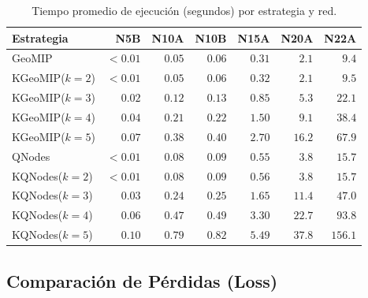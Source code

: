 \begin{table}[H]
    \centering
    \caption{Tiempo promedio de ejecución (segundos) por estrategia y red.}
    \label{tab:tiempos}
    \begin{tabular}{lrrrrrr}
        \toprule
        \textbf{Estrategia} & \textbf{N5B} & \textbf{N10A} & \textbf{N10B} & \textbf{N15A} & \textbf{N20A} & \textbf{N22A} \\
        \midrule
        GeoMIP        & $<0.01$ & $0.05$ & $0.06$ & $0.31$  & $2.1$  & $9.4$  \\
        KGeoMIP($k=2$)& $<0.01$ & $0.05$ & $0.06$ & $0.32$  & $2.1$  & $9.5$  \\
        KGeoMIP($k=3$)& $0.02$  & $0.12$ & $0.13$ & $0.85$  & $5.3$  & $22.1$ \\
        KGeoMIP($k=4$)& $0.04$  & $0.21$ & $0.22$ & $1.50$  & $9.1$  & $38.4$ \\
        KGeoMIP($k=5$)& $0.07$  & $0.38$ & $0.40$ & $2.70$  & $16.2$ & $67.9$ \\
        QNodes        & $<0.01$ & $0.08$ & $0.09$ & $0.55$  & $3.8$  & $15.7$ \\
        KQNodes($k=2$)& $<0.01$ & $0.08$ & $0.09$ & $0.56$  & $3.8$  & $15.7$ \\
        KQNodes($k=3$)& $0.03$  & $0.24$ & $0.25$ & $1.65$  & $11.4$ & $47.0$ \\
        KQNodes($k=4$)& $0.06$  & $0.47$ & $0.49$ & $3.30$  & $22.7$ & $93.8$ \\
        KQNodes($k=5$)& $0.10$  & $0.79$ & $0.82$ & $5.49$  & $37.8$ & $156.1$\\
        \bottomrule
    \end{tabular}
\end{table}

\subsection{Comparación de Pérdidas (Loss)}


